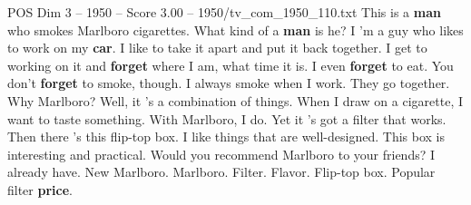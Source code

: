 \begin{textsample}{POS Dim 3 – 1950 – Score 3.00 – 1950/tv\_com\_1950\_110.txt}  \label{ex:f3_pos_017}
This is a \textbf{man} who smokes Marlboro cigarettes.
What kind of a \textbf{man} is he?
I 'm a guy who likes to work on my \textbf{car}.
I like to take it apart and put it back together.
I get to working on it and \textbf{forget} where I am, what time it is.
I even \textbf{forget} to eat.
You don't \textbf{forget} to smoke, though.
I always smoke when I work.
They go together.
Why Marlboro?
Well, it 's a combination of things.
When I draw on a cigarette, I want to taste something.
With Marlboro, I do.
Yet it 's got a filter that works.
Then there 's this flip-top box.
I like things that are well-designed.
This box is interesting and practical.
Would you recommend Marlboro to your friends?
I already have.
New Marlboro.
Marlboro.
Filter.
Flavor.
Flip-top box.
Popular filter \textbf{price}.

\end{textsample}
